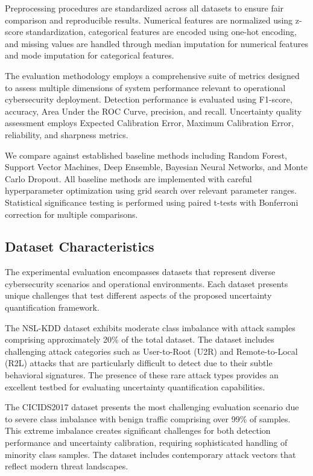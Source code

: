 \documentclass[journal]{IEEEtran}
\begin{document}
Preprocessing procedures are standardized across all datasets to ensure fair comparison and reproducible results. Numerical features are normalized using z-score standardization, categorical features are encoded using one-hot encoding, and missing values are handled through median imputation for numerical features and mode imputation for categorical features.

The evaluation methodology employs a comprehensive suite of metrics designed to assess multiple dimensions of system performance relevant to operational cybersecurity deployment. Detection performance is evaluated using F1-score, accuracy, Area Under the ROC Curve, precision, and recall. Uncertainty quality assessment employs Expected Calibration Error, Maximum Calibration Error, reliability, and sharpness metrics.

We compare against established baseline methods including Random Forest, Support Vector Machines, Deep Ensemble, Bayesian Neural Networks, and Monte Carlo Dropout. All baseline methods are implemented with careful hyperparameter optimization using grid search over relevant parameter ranges. Statistical significance testing is performed using paired t-tests with Bonferroni correction for multiple comparisons.

\subsection{Dataset Characteristics}

The experimental evaluation encompasses datasets that represent diverse cybersecurity scenarios and operational environments. Each dataset presents unique challenges that test different aspects of the proposed uncertainty quantification framework.

The NSL-KDD dataset exhibits moderate class imbalance with attack samples comprising approximately 20\% of the total dataset. The dataset includes challenging attack categories such as User-to-Root (U2R) and Remote-to-Local (R2L) attacks that are particularly difficult to detect due to their subtle behavioral signatures. The presence of these rare attack types provides an excellent testbed for evaluating uncertainty quantification capabilities.

The CICIDS2017 dataset presents the most challenging evaluation scenario due to severe class imbalance with benign traffic comprising over 99\% of samples. This extreme imbalance creates significant challenges for both detection performance and uncertainty calibration, requiring sophisticated handling of minority class samples. The dataset includes contemporary attack vectors that reflect modern threat landscapes.
\end{document}
